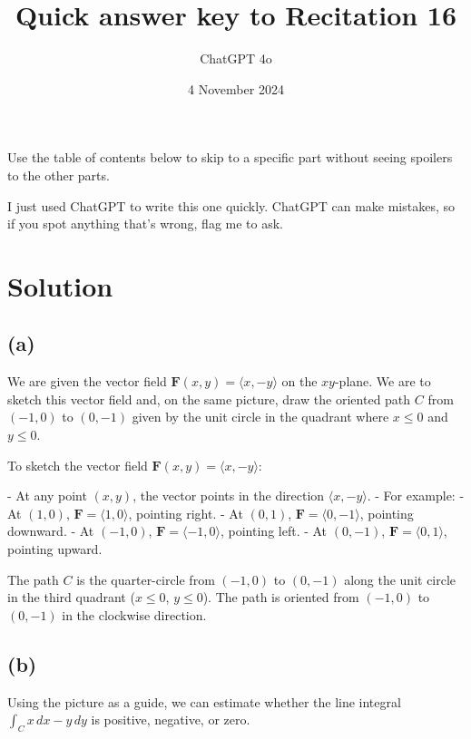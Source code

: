 \documentclass[11pt]{article}
\begin{document}
\title{Quick answer key to Recitation 16}
\author{ChatGPT 4o}
\date{4 November 2024}
\maketitle

Use the table of contents below to skip to a specific part
without seeing spoilers to the other parts.

I just used ChatGPT to write this one quickly.
ChatGPT can make mistakes, so if you spot anything that's wrong, flag me to ask.

\tableofcontents

\newpage

\section{Solution}

\subsection{(a)}

We are given the vector field $\mathbf{F}(x, y) = \langle x, -y \rangle$ on the $xy$-plane. We are to sketch this vector field and, on the same picture, draw the oriented path $C$ from $(-1, 0)$ to $(0, -1)$ given by the unit circle in the quadrant where $x \leq 0$ and $y \leq 0$.

To sketch the vector field $\mathbf{F}(x, y) = \langle x, -y \rangle$:

- At any point $(x, y)$, the vector points in the direction $\langle x, -y \rangle$.
- For example:
  - At $(1, 0)$, $\mathbf{F} = \langle 1, 0 \rangle$, pointing right.
  - At $(0, 1)$, $\mathbf{F} = \langle 0, -1 \rangle$, pointing downward.
  - At $(-1, 0)$, $\mathbf{F} = \langle -1, 0 \rangle$, pointing left.
  - At $(0, -1)$, $\mathbf{F} = \langle 0, 1 \rangle$, pointing upward.

The path $C$ is the quarter-circle from $(-1, 0)$ to $(0, -1)$ along the unit circle in the third quadrant ($x \leq 0$, $y \leq 0$). The path is oriented from $(-1, 0)$ to $(0, -1)$ in the clockwise direction.

\newpage

\subsection{(b)}

Using the picture as a guide, we can estimate whether the line integral $\displaystyle \int_C x \, dx - y \, dy$ is positive, negative, or zero.
\end{document}
